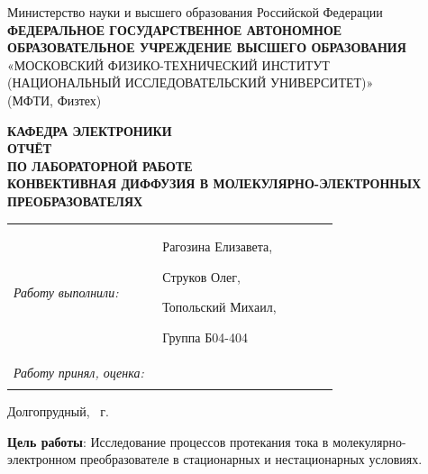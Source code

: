 \documentclass[12pt, a4paper]{article}
\begin{document}

\begin{titlepage}
\thispagestyle{empty}

\begin{center}
\small
Министерство науки и высшего образования Российской Федерации\\[2mm]
\textbf{ФЕДЕРАЛЬНОЕ ГОСУДАРСТВЕННОЕ АВТОНОМНОЕ
ОБРАЗОВАТЕЛЬНОЕ УЧРЕЖДЕНИЕ ВЫСШЕГО ОБРАЗОВАНИЯ}\\[1mm]
«МОСКОВСКИЙ ФИЗИКО-ТЕХНИЧЕСКИЙ ИНСТИТУТ\\
(НАЦИОНАЛЬНЫЙ ИССЛЕДОВАТЕЛЬСКИЙ УНИВЕРСИТЕТ)»\\
(МФТИ, Физтех)
\end{center}

\vspace{18mm}

\begin{center}
\large \textbf{КАФЕДРА ЭЛЕКТРОНИКИ}\\[10mm]
\Large \textbf{ОТЧЁТ}\\[2mm]
\large \textbf{ПО ЛАБОРАТОРНОЙ РАБОТЕ}\\[14mm]
\Large \textbf{КОНВЕКТИВНАЯ ДИФФУЗИЯ В МОЛЕКУЛЯРНО-ЭЛЕКТРОННЫХ ПРЕОБРАЗОВАТЕЛЯХ}
\end{center}

\vfill

\noindent
\begin{tabular}{@{}p{0.44\linewidth}p{0.52\linewidth}@{}}
\textit{Работу выполнили:} & Рагозина Елизавета,

Струков Олег,

Топольский Михаил,

Группа Б04-404 \\[8mm]

\textit{Работу принял, оценка:} & \\[3mm]
 \\
\end{tabular}


\vspace{12mm}

\begin{center}
\small Долгопрудный, \the\year{}~г.
\end{center}

\end{titlepage}




\newpage
{}

\textbf{Цель работы}: Исследование процессов протекания тока в молекулярно-электронном преобразователе в стационарных и нестационарных условиях. 
\end{document}

